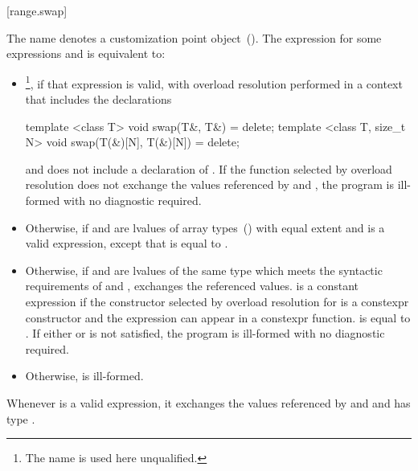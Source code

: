 {\color{addclr}
\setcounter{section}{2}
\setcounter{subsection}{2}
[range.swap]{}

%
\pnum The name  denotes a customization point
object~(). The  expression
 for some expressions 
and  is equivalent to:

\begin{itemize}
\item
  \footnote{The name  is used here unqualified.}, if that expression is valid, with overload resolution
  performed in a context that includes the declarations
\begin{codeblock}
  template <class T>
  void swap(T&, T&) = delete;
  template <class T, size_t N>
  void swap(T(&)[N], T(&)[N]) = delete;
\end{codeblock}
  and does not include a declaration of .
  If the function selected by overload resolution does not
  exchange the values referenced by  and ,
  the program is ill-formed with no diagnostic required.

\item
  Otherwise,  if  and
   are lvalues of array types~()
  with equal extent and 
  is a valid expression, except that
   is equal to
  .

\item
  Otherwise, if  and  are lvalues of the
  same type  which meets the syntactic requirements of
   and
  , exchanges the referenced values.
   is a constant expression if
  the constructor selected by overload resolution for
   is a constexpr constructor and
  the expression  can appear in a
  constexpr function. 
  is equal to . If either
   or
   is not satisfied, the program
  is ill-formed with no diagnostic required.

\item
  Otherwise,  is ill-formed.
\end{itemize}

\pnum
\remark Whenever  is a valid
expression, it exchanges the values referenced by 
and  and has type .
} %

